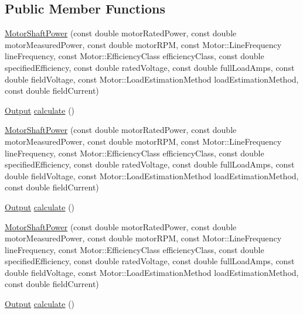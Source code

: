 \subsection*{Public Member Functions}
\begin{DoxyCompactItemize}
\item 
\hyperlink{class_motor_shaft_power_acf65f63b1c78946df0987dd1a9a98c77}{Motor\+Shaft\+Power} (const double motor\+Rated\+Power, const double motor\+Measured\+Power, const double motor\+R\+PM, const Motor\+::\+Line\+Frequency line\+Frequency, const Motor\+::\+Efficiency\+Class efficiency\+Class, const double specified\+Efficiency, const double rated\+Voltage, const double full\+Load\+Amps, const double field\+Voltage, const Motor\+::\+Load\+Estimation\+Method load\+Estimation\+Method, const double field\+Current)
\item 
\hyperlink{struct_motor_shaft_power_1_1_output}{Output} \hyperlink{class_motor_shaft_power_a6823c05e9c0aaac25f3ef7b26ba613d2}{calculate} ()
\item 
\hyperlink{class_motor_shaft_power_acf65f63b1c78946df0987dd1a9a98c77}{Motor\+Shaft\+Power} (const double motor\+Rated\+Power, const double motor\+Measured\+Power, const double motor\+R\+PM, const Motor\+::\+Line\+Frequency line\+Frequency, const Motor\+::\+Efficiency\+Class efficiency\+Class, const double specified\+Efficiency, const double rated\+Voltage, const double full\+Load\+Amps, const double field\+Voltage, const Motor\+::\+Load\+Estimation\+Method load\+Estimation\+Method, const double field\+Current)
\item 
\hyperlink{struct_motor_shaft_power_1_1_output}{Output} \hyperlink{class_motor_shaft_power_a1742d76cbea8f0469bf510238d183867}{calculate} ()
\item 
\hyperlink{class_motor_shaft_power_acf65f63b1c78946df0987dd1a9a98c77}{Motor\+Shaft\+Power} (const double motor\+Rated\+Power, const double motor\+Measured\+Power, const double motor\+R\+PM, const Motor\+::\+Line\+Frequency line\+Frequency, const Motor\+::\+Efficiency\+Class efficiency\+Class, const double specified\+Efficiency, const double rated\+Voltage, const double full\+Load\+Amps, const double field\+Voltage, const Motor\+::\+Load\+Estimation\+Method load\+Estimation\+Method, const double field\+Current)
\item 
\hyperlink{struct_motor_shaft_power_1_1_output}{Output} \hyperlink{class_motor_shaft_power_a1742d76cbea8f0469bf510238d183867}{calculate} ()
\end{DoxyCompactItemize}


